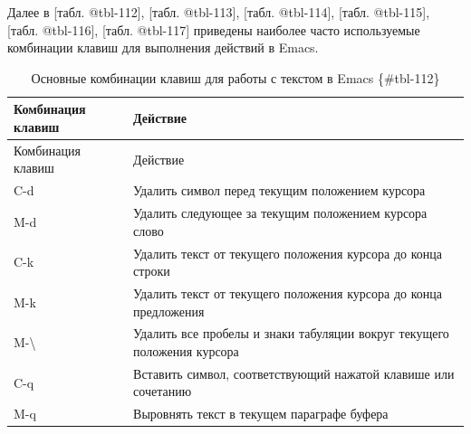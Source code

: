 \documentclass[
  english,
  russian,
  12pt,
  a4paper,
]{scrreprt}
\begin{document}
Далее в {[}табл. @tbl-112{]}, {[}табл. @tbl-113{]}, {[}табл.
@tbl-114{]}, {[}табл. @tbl-115{]}, {[}табл. @tbl-116{]}, {[}табл.
@tbl-117{]} приведены наиболее часто используемые комбинации клавиш для
выполнения действий в Emacs.

\begin{longtable}[]{@{}
  >{\raggedright\arraybackslash}p{}
  >{\raggedright\arraybackslash}p{}@{}}
\caption{Основные комбинации клавиш для работы с текстом в Emacs
\{\#tbl-112\}}\tabularnewline
\toprule\noalign{}
\begin{minipage}[b]{\linewidth}\raggedright
Комбинация клавиш
\end{minipage} & \begin{minipage}[b]{\linewidth}\raggedright
Действие
\end{minipage} \\
\midrule\noalign{}
\endfirsthead
\toprule\noalign{}
\begin{minipage}[b]{\linewidth}\raggedright
Комбинация клавиш
\end{minipage} & \begin{minipage}[b]{\linewidth}\raggedright
Действие
\end{minipage} \\
\midrule\noalign{}
\endhead
\bottomrule\noalign{}
\endlastfoot
C-d & Удалить символ перед текущим положением курсора \\
M-d & Удалить следующее за текущим положением курсора слово \\
C-k & Удалить текст от текущего положения курсора до конца строки \\
M-k & Удалить текст от текущего положения курсора до конца
предложения \\
M-\textbackslash{} & Удалить все пробелы и знаки табуляции вокруг
текущего положения курсора \\
C-q & Вставить символ, соответствующий нажатой клавише или сочетанию \\
M-q & Выровнять текст в текущем параграфе буфера \\
\end{longtable}
\end{document}
